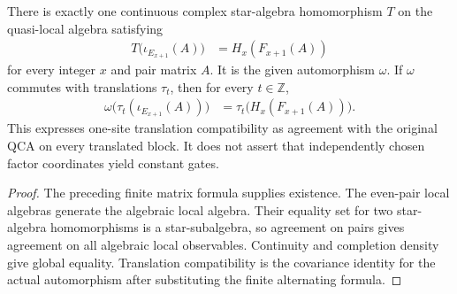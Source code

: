 \begin{lemma}
    \label{lem:qca_margolus_global_extension}
    \leanok
    There is exactly one continuous complex star-algebra homomorphism
    $T$ on the quasi-local algebra satisfying
    \begin{align}
        T\bigl(\iota_{E_{x+1}}(A)\bigr) & =H_x(F_{x+1}(A))
    \end{align}
    for every integer $x$ and pair matrix $A$. It is the given
    automorphism $\omega$. If $\omega$ commutes with translations
    $\tau_t$, then for every $t\in\mathbb Z$,
    \begin{align}
        \omega\bigl(\tau_t(\iota_{E_{x+1}}(A))\bigr)
         & =\tau_t\bigl(H_x(F_{x+1}(A))\bigr).
    \end{align}
    This expresses one-site translation compatibility as agreement with
    the original QCA on every translated block. It does not assert that
    independently chosen factor coordinates yield constant gates.
\end{lemma}
\begin{proof}
    \leanok
    The preceding finite matrix formula supplies existence. The even-pair
    local algebras generate the algebraic local algebra. Their equality
    set for two star-algebra homomorphisms is a star-subalgebra, so
    agreement on pairs gives agreement on all algebraic local observables.
    Continuity and completion density give global equality. Translation
    compatibility is the covariance identity for the actual automorphism
    after substituting the finite alternating formula.
\end{proof}
